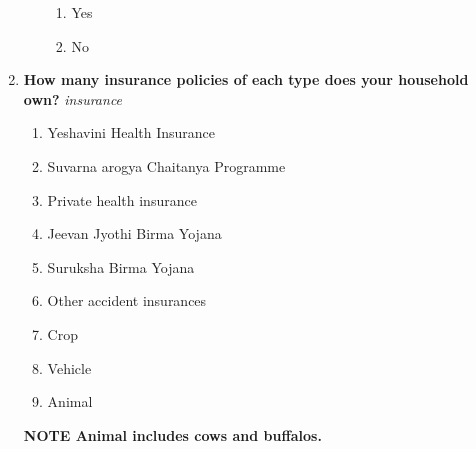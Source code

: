 \documentclass{article}
\begin{document}
\begin{enumerate}
\begin{enumerate}[label*=\arabic*.]
\begin{enumerate}
\item Yes
\item No
\end{enumerate}
\end{enumerate}
\item {\bfseries How many insurance policies of each type does your household own?}\emph{ insurance }
\begin{enumerate}
\item Yeshavini Health Insurance
\item Suvarna arogya Chaitanya Programme
\item Private health insurance
\item Jeevan Jyothi Birma Yojana
\item Suruksha Birma Yojana
\item  Other accident insurances
\item Crop
\item Vehicle
\item Animal
\end{enumerate}\textbf{{\footnotesize NOTE} Animal includes cows and buffalos. }


\end{enumerate}
\end{document}
